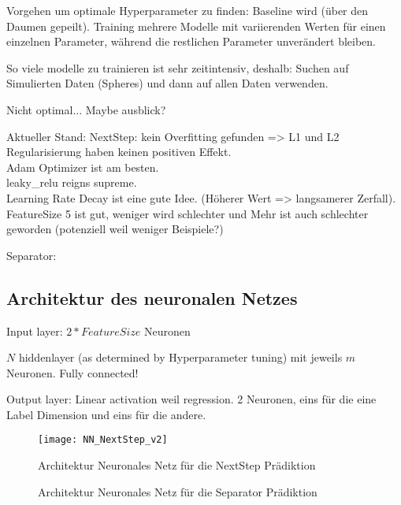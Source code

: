 Vorgehen um optimale Hyperparameter zu finden: 
Baseline wird (über den Daumen gepeilt).
Training mehrere Modelle mit variierenden Werten für einen einzelnen Parameter, 
während die restlichen Parameter unverändert bleiben.

So viele modelle zu trainieren ist sehr zeitintensiv, deshalb:
Suchen auf Simulierten Daten (Spheres) und dann auf allen Daten verwenden.

Nicht optimal... Maybe ausblick?


Aktueller Stand:
NextStep: kein Overfitting gefunden => L1 und L2 Regularisierung haben keinen positiven Effekt.\\
Adam Optimizer ist am besten.\\
leaky\_relu reigns supreme. \\
Learning Rate Decay ist eine gute Idee. (Höherer Wert => langsamerer Zerfall). \\
FeatureSize 5 ist gut, weniger wird schlechter und Mehr ist auch schlechter geworden (potenziell weil weniger Beispiele?)


Separator: 

\subsection{Architektur des neuronalen Netzes}

Input layer: \(2 * FeatureSize\) Neuronen

\(N\) hiddenlayer (as determined by Hyperparameter tuning) mit jeweils \(m\) Neuronen.
Fully connected!

Output layer:
Linear activation weil regression.
2 Neuronen, eins für die eine Label Dimension und eins für die andere.

\begin{figure}
    \centering
	\texttt{[image: NN\_NextStep\_v2]}
	\caption{Architektur Neuronales Netz für die NextStep Prädiktion}
	\label{fig:netArchitectureNextStep}
\end{figure}

\begin{figure}
    \centering
	\caption{Architektur Neuronales Netz für die Separator Prädiktion}
	\label{fig:netArchitectureSep}
\end{figure}
